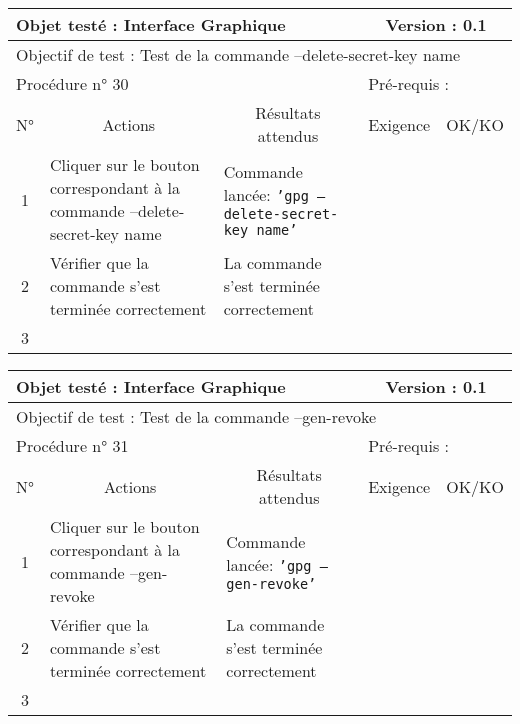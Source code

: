 \documentclass{../res/univ-projet}
\begin{document}
\begin{center}
\begin{tabular}{|c|p{5cm}|p{5cm}|p{1.5cm}|p{1.5cm}|}
\hline
\multicolumn{3}{|l|}{Objet testé : Interface Graphique} & \multicolumn{2}{c|}{Version : 0.1}\\ \hline
\multicolumn{5}{|l|}{Objectif de test : Test de la commande –delete-secret-key name}\\ \hline
\multicolumn{3}{|l|}{Procédure n° 30} & \multicolumn{2}{p{3cm}|}{Pré-requis : }\\ \hline
\multicolumn{1}{|c|}{N°} & \multicolumn{1}{c|}{Actions} & \multicolumn{1}{c|}{Résultats attendus} & 
\multicolumn{1}{c|}{Exigence} & \multicolumn{1}{c|}{OK/KO}\\ \hline
1 & Cliquer sur le bouton correspondant à la commande –delete-secret-key name & Commande lancée: \texttt{'gpg –delete-secret-key name'} &  & \\
2 & Vérifier que la commande s'est terminée correctement & La commande s'est terminée correctement &  & \\
3 &  &  &  & \\ \hline
\end{tabular}
\vskip 2.2cm


\begin{tabular}{|c|p{5cm}|p{5cm}|p{1.5cm}|p{1.5cm}|}
\hline
\multicolumn{3}{|l|}{Objet testé : Interface Graphique} & \multicolumn{2}{c|}{Version : 0.1}\\ \hline
\multicolumn{5}{|l|}{Objectif de test : Test de la commande –gen-revoke}\\ \hline
\multicolumn{3}{|l|}{Procédure n° 31} & \multicolumn{2}{p{3cm}|}{Pré-requis : }\\ \hline
\multicolumn{1}{|c|}{N°} & \multicolumn{1}{c|}{Actions} & \multicolumn{1}{c|}{Résultats attendus} & 
\multicolumn{1}{c|}{Exigence} & \multicolumn{1}{c|}{OK/KO}\\ \hline
1 & Cliquer sur le bouton correspondant à la commande –gen-revoke & Commande lancée: \texttt{'gpg –gen-revoke'} &  & \\
2 & Vérifier que la commande s'est terminée correctement & La commande s'est terminée correctement &  & \\
3 &  &  &  & \\ \hline
\end{tabular}
\vskip 2.2cm



\end{center}
\end{document}

